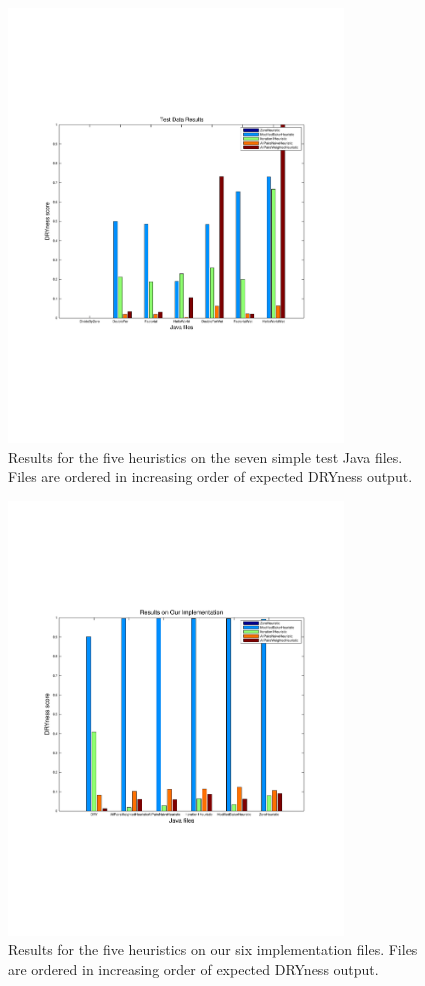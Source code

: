 \documentclass{article}
\begin{document}
\begin{figure}
\centering
\includegraphics[clip=true, trim=0.75in 2.5in 0in 2.5in, width=3.5in]{../testPlot.pdf}
\caption{Results for the five heuristics on the seven simple test Java files. Files are ordered in increasing order of 
expected DRYness output.}
\label{fig:test}
\end{figure}
\begin{figure}
\centering
\includegraphics[clip=true, trim=0.75in 2.5in 0in 2.5in, width=3.5in]{../dryPlot.pdf}
\caption{Results for the five heuristics on our six implementation files. Files are ordered in increasing order of 
expected DRYness output.}
\label{fig:dry}
\end{figure}
\end{document}
